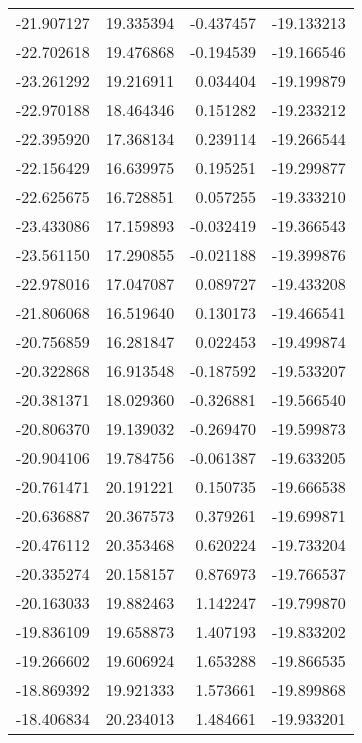\begin{tabular}{rrrr}
      -21.907127 &        19.335394 &   -0.437457 & -19.133213 \\
      -22.702618 &        19.476868 &   -0.194539 & -19.166546 \\
      -23.261292 &        19.216911 &    0.034404 & -19.199879 \\
      -22.970188 &        18.464346 &    0.151282 & -19.233212 \\
      -22.395920 &        17.368134 &    0.239114 & -19.266544 \\
      -22.156429 &        16.639975 &    0.195251 & -19.299877 \\
      -22.625675 &        16.728851 &    0.057255 & -19.333210 \\
      -23.433086 &        17.159893 &   -0.032419 & -19.366543 \\
      -23.561150 &        17.290855 &   -0.021188 & -19.399876 \\
      -22.978016 &        17.047087 &    0.089727 & -19.433208 \\
      -21.806068 &        16.519640 &    0.130173 & -19.466541 \\
      -20.756859 &        16.281847 &    0.022453 & -19.499874 \\
      -20.322868 &        16.913548 &   -0.187592 & -19.533207 \\
      -20.381371 &        18.029360 &   -0.326881 & -19.566540 \\
      -20.806370 &        19.139032 &   -0.269470 & -19.599873 \\
      -20.904106 &        19.784756 &   -0.061387 & -19.633205 \\
      -20.761471 &        20.191221 &    0.150735 & -19.666538 \\
      -20.636887 &        20.367573 &    0.379261 & -19.699871 \\
      -20.476112 &        20.353468 &    0.620224 & -19.733204 \\
      -20.335274 &        20.158157 &    0.876973 & -19.766537 \\
      -20.163033 &        19.882463 &    1.142247 & -19.799870 \\
      -19.836109 &        19.658873 &    1.407193 & -19.833202 \\
      -19.266602 &        19.606924 &    1.653288 & -19.866535 \\
      -18.869392 &        19.921333 &    1.573661 & -19.899868 \\
      -18.406834 &        20.234013 &    1.484661 & -19.933201 \\

\end{tabular}
